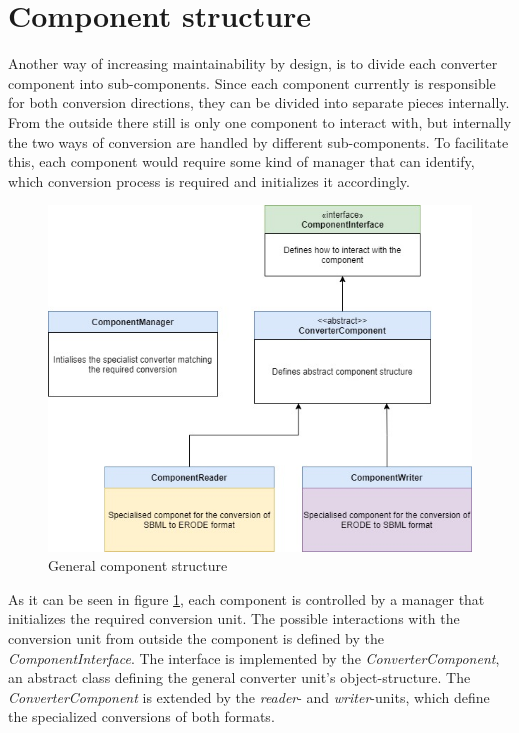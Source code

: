 \section{Component structure}
Another way of increasing maintainability by design, is to divide each converter component into sub-components. Since each component currently is responsible for both conversion directions, they can be divided into separate pieces internally. From the outside there still is only one component to interact with, but internally the two ways of conversion are handled by different sub-components.
To facilitate this, each component would require some kind of manager that can identify, which conversion process is required and initializes it accordingly.
\begin{figure}[H]
    \centering
    \includegraphics[scale=0.45]{Sections/Images/ComponentStructure.jpg}
    \caption{General component structure}
    \label{fig:component}
\end{figure}
As it can be seen in figure \ref{fig:component}, each component is controlled by a manager that initializes the required conversion unit. The possible interactions with the conversion unit from outside the component is defined by the \emph{ComponentInterface}. The interface is implemented by the \emph{ConverterComponent}, an abstract class defining the general converter unit's object-structure. The \emph{ConverterComponent} is extended by the \emph{reader}- and \emph{writer}-units, which define the specialized conversions of both formats. 

